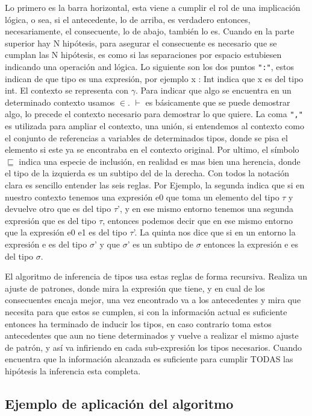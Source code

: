 Lo primero es la barra horizontal, esta viene a cumplir el rol de una implicación lógica, o sea, si el antecedente, lo de arriba, es verdadero entonces, necesariamente, el consecuente, lo de abajo, también lo es. Cuando en la parte superior hay N hipótesis, para asegurar el consecuente es necesario que se cumplan las N hipótesis, es como si las separaciones por espacio estubiesen indicando una operación and lógica.
Lo siguiente son los dos puntos \lstinline$":"$, estos indican de que tipo es una expresión, por ejemplo x : Int indica que x es del tipo int. El contexto se representa con $\gamma$. Para indicar que algo se encuentra en un determinado contexto usamos $\in$. $\vdash$ es básicamente que se puede demostrar algo, lo precede el contexto necesario para demostrar lo que quiere. La coma \lstinline$","$ es utilizada para ampliar el contexto, una unión, si entendemos al contexto como el conjunto de referencias a variables de determinados tipos, donde se pisa el elemento si este ya se encontraba en el contexto original. Por ultimo, el símbolo $\sqsubseteq$ indica una especie de inclusión, en realidad es mas bien una herencia, donde el tipo de la izquierda es un subtipo del de la derecha.
Con todos la notación clara es sencillo entender las seis reglas.
Por Ejemplo, la segunda indica que si en nuestro contexto tenemos una expresión e0 que  toma un elemento del tipo  $\tau$ y devuelve otro que es del tipo $\tau$', y en ese mismo entorno tenemos una segunda expresión que es del tipo $\tau$, entonces podemos decir que en ese mismo entorno que la expresión e0 e1 es del tipo $\tau$'.
La quinta nos dice que si en un entorno la expresión e es del tipo $\sigma$' y que $\sigma$' es un subtipo de $\sigma$ entonces la expresión e es del tipo  $\sigma$.

El algoritmo de inferencia de tipos usa estas reglas de forma recursiva. Realiza un ajuste de patrones, donde mira la expresión que tiene, y en cual de los consecuentes encaja mejor, una vez encontrado va a los antecedentes y mira que necesita para que estos se cumplen, si con la información actual es suficiente entonces ha terminado de inducir los tipos, en caso contrario toma estos antecedentes que aun no tiene determinados y vuelve a realizar el mismo ajuste de patrón, y así va infiriendo en cada sub-expresión los tipos necesarios. Cuando encuentra que la información alcanzada es suficiente para cumplir TODAS las hipótesis la inferencia esta completa.

\label{sub:algoritmo_de_hindley_milner}

\subsection{Ejemplo de aplicación del algoritmo} %
\label{sub:ejemplo_de_aplicaci_n_del_algoritmo}

